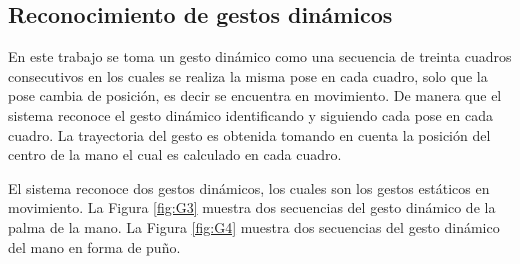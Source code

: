 \subsection{Reconocimiento de gestos dinámicos}\label{RecognitionDynamic}


En este trabajo se toma un gesto dinámico como una secuencia de treinta cuadros consecutivos en los cuales se realiza la misma pose en cada cuadro, solo que la pose cambia de posición, es decir se encuentra en movimiento. De manera que el sistema reconoce el gesto dinámico identificando y siguiendo cada pose en cada cuadro. La trayectoria del gesto es obtenida tomando en cuenta la posición del centro de la mano el cual es calculado en cada cuadro. 
 
El sistema reconoce dos gestos dinámicos, los cuales son los gestos estáticos en movimiento. La Figura \ref{fig:G3} muestra dos secuencias del gesto dinámico de la palma de la mano. La Figura \ref{fig:G4} muestra dos secuencias del gesto dinámico del mano en forma de pu\~no.  
